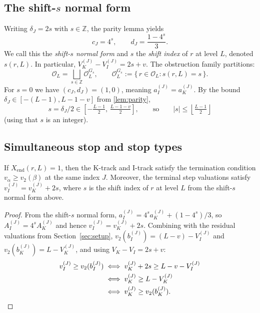 \documentclass[11pt,reqno]{amsart}
\newcommand{\Z}{\mathbb{Z}}
\newcommand{\Obs}{\mathcal{O}}
\newcommand{\Xend}{X_{\mathrm{end}}}
\newcommand{\Vk}{V_{K}}
\newcommand{\Vi}{V_{I}}
\newcommand{\vk}{v_{K}}
\newcommand{\vi}{v_{I}}
\newcommand{\vtwo}{v_{2}}
\begin{document}
\subsection{The shift-\texorpdfstring{$s$}{s} normal form}

Writing $\delta_J = 2s$ with $s \in \Z$, the parity lemma yields
\[
c_J = 4^s, \qquad d_J = \frac{1 - 4^s}{3}.
\]
We call this the \emph{shift-$s$ normal form} and $s$ the \emph{shift index}
of $r$ at level $L$, denoted $s(r, L)$. In particular,
$\Vk^{(J)} - \Vi^{(J)} = 2s + v$. The obstruction family partitions:
\[
\Obs_L = \bigsqcup_{s \in \Z} \Obs_L^{G_s}, \qquad \Obs_L^{G_s} := \{\, r \in \Obs_L : s(r, L) = s \,\}.
\]
For $s = 0$ we have $(c_J, d_J) = (1, 0)$, meaning $a_I^{(J)} = a_K^{(J)}$.
By the bound $\delta_J \in [-(L-1), L - 1 - v]$ from \cref{lem:parity},
\[
s = \delta_J/2 \in \left[-\tfrac{L-1}{2},\, \tfrac{L - 1 - v}{2}\right],
\qquad\text{so}\qquad
\lvert s\rvert \le \left\lfloor \tfrac{L-1}{2} \right\rfloor
\]
(using that $s$ is an integer).

\subsection{Simultaneous stop and stop types}

\begin{corollary}
\label{cor:sync}
If $\Xend(r, L) = 1$, then the K-track and I-track satisfy the termination
condition $v_\alpha \ge \vtwo(\beta)$ at the same index $J$. Moreover, the
terminal step valuations satisfy $\vi^{(J)} = \vk^{(J)} + 2s$, where $s$
is the shift index of $r$ at level $L$ from the shift-$s$ normal form above.
\end{corollary}

\begin{proof}
From the shift-$s$ normal form, $a_I^{(J)} = 4^s a_K^{(J)} + (1-4^s)/3$, so
$A_I^{(J)} = 4^s A_K^{(J)}$ and hence $\vi^{(J)} = \vk^{(J)} + 2s$.
Combining with the residual valuations from Section~\ref{sec:setup},
$\vtwo(b_I^{(J)}) = (L-v) - \Vi^{(J)}$ and $\vtwo(b_K^{(J)}) = L - \Vk^{(J)}$,
and using $\Vk - \Vi = 2s + v$:
\begin{align*}
\vi^{(J)} \ge \vtwo(b_I^{(J)})
  &\iff \vk^{(J)} + 2s \ge L - v - \Vi^{(J)} \\
  &\iff \vk^{(J)} \ge L - \Vk^{(J)} \\
  &\iff \vk^{(J)} \ge \vtwo(b_K^{(J)}). \qedhere
\end{align*}
\end{proof}
\end{document}
